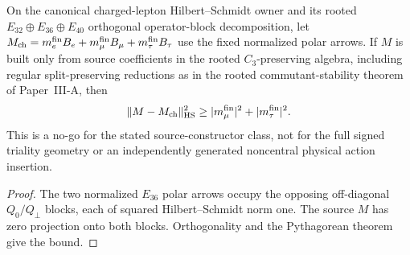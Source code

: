 \documentclass[12pt,a4paper]{article}
\begin{document}
\begin{corollary}
\label{p5:cor:charged-c3-source-no-go}
On the canonical charged-lepton Hilbert--Schmidt owner and its
rooted $E_{32}\oplus E_{36}\oplus E_{40}$ orthogonal operator-block
decomposition, let
$M_{\rm ch}=m_e^{\rm fin}B_e+m_\mu^{\rm fin}B_\mu
 +m_\tau^{\rm fin}B_\tau$
use the fixed normalized polar arrows. If $M$ is built only
from source coefficients in the rooted $C_3$-preserving algebra,
including regular split-preserving reductions as in
the rooted commutant-stability theorem of Paper~III-A, then
\[
 \|M-M_{\rm ch}\|_{\rm HS}^2\ge
 |m_\mu^{\rm fin}|^2+|m_\tau^{\rm fin}|^2.
\]
This is a no-go for the stated source-constructor class, not
for the full signed triality geometry or an independently generated
noncentral physical action insertion.
\end{corollary}
\begin{proof}
The two normalized $E_{36}$ polar arrows occupy the opposing
off-diagonal $Q_0/Q_\perp$ blocks, each of squared
Hilbert--Schmidt norm one. The source $M$ has zero projection onto
both blocks. Orthogonality and the Pythagorean theorem give the bound.
\end{proof}
\end{document}
